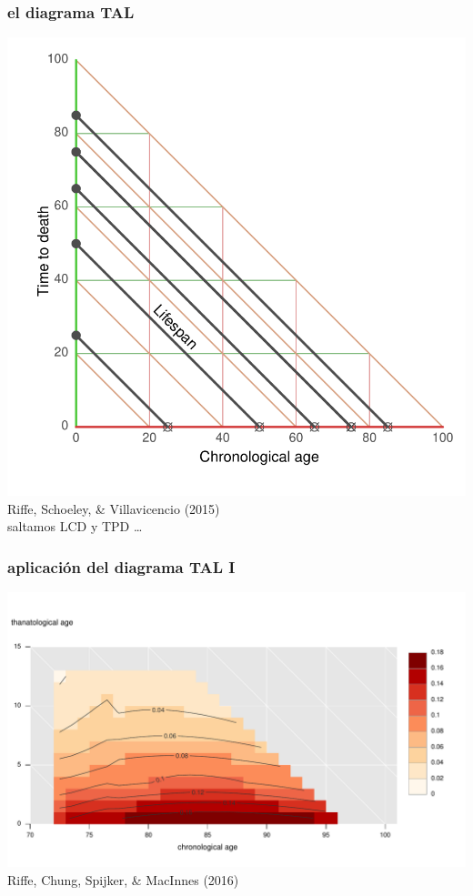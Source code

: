 \documentclass[20pt]{beamer}
\begin{document}
\begin{frame}
\frametitle{el diagrama TAL}
\hspace{2cm}\includegraphics[scale=.9]{Figures/TALrt.pdf}\\
Riffe, Schoeley, \& Villavicencio (2015) \\ saltamos LCD y TPD \ldots
\end{frame}

\begin{frame}
\frametitle{aplicaci\'{o}n del diagrama TAL I}
\hspace{2cm}\includegraphics[scale=.9]{Figures/TAL_male_psych.pdf}\\
Riffe, Chung, Spijker, \& MacInnes (2016)
\end{frame}
\end{document}
